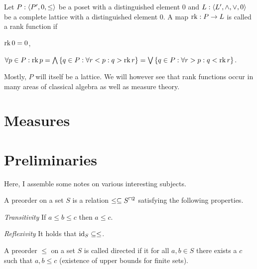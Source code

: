 \documentclass[8pt,a4paper]{article}
\begin{document}
\begin{definition}
    Let $P:\struct{P',0,\leq}$ be a poset with a distinguished element 0 and $L:\struct{L',\meet,\join,0}$ be a complete lattice with a distinguished element 0.
    A map $\mathop\mathrm{rk}:P\rightarrow L$ is called a rank function if
    \begin{properties}
            \item $\mathop\mathrm{rk}{0}=0$,
            \item $\forall p\in P: \rk{p}=\Meet\set{q\in P:\forall r<p: q>\rk{r}}=\Join\set{q\in P:\forall r>p: q<\rk{r}}$.
    \end{properties}
\end{definition}

\begin{remark}
    Mostly, $P$ will itself be a lattice. We will however see that rank functions occur in many areas of classical algebra as well as measure theory.
\end{remark}



\section{Measures}



\section{Preliminaries}

Here, I assemble some notes on various interesting subjects.

\begin{definition}[preorder]
    A preorder on a set $S$ is a relation $\leq\setleq S^{\settimes2}$ satisfying the following properties.
    \begin{statements}
            \item \emph{Transitivity} If $a\leq b\leq c$ then $a\leq c$.
            \item \emph{Reflexivity} It holds that $\mathop\mathrm{id}\nolimits_S\subseteq \leq$. 
    \end{statements}
\end{definition}

\begin{definition}[Directedness]
    A preorder $\leq$ on a set $S$ is called directed if it for all $a,b\in S$ there exists a $c$ such that $a,b\leq c$ (existence of upper bounds for finite sets).
\end{definition}
\end{document}
